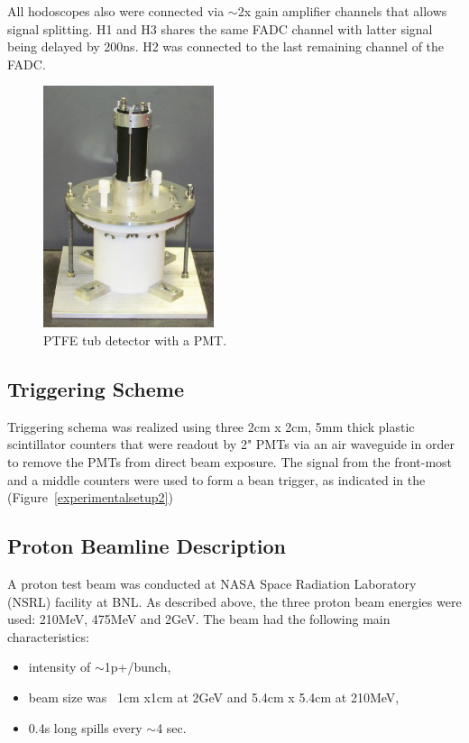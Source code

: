 \documentclass[preprint,12pt]{elsarticle}
\begin{document}
All hodoscopes also were connected via $\sim$2x gain amplifier channels that allows signal splitting. H1 and H3 shares the same FADC channel with latter signal being delayed by 200ns. H2 was connected to the last remaining channel of the FADC.





\begin{figure}[ht]
\centering
\includegraphics[width=50mm]{figure1_tub.jpg}
\caption{PTFE tub detector with a PMT.} \label{whitetubpicture}
\end{figure}

\subsection{Triggering Scheme}
\label{trigs}
Triggering schema was realized using three 2cm x 2cm, 5mm thick plastic scintillator counters that were readout by 2" PMTs via an air waveguide in order to remove the PMTs from direct beam exposure. The signal from the front-most and a middle counters were used to form a bean trigger, as indicated in the (Figure~\ref{experimentalsetup2})




\subsection{Proton Beamline Description}
A proton test beam was conducted at NASA Space Radiation Laboratory (NSRL) facility at BNL. As described above, the three proton beam energies were used:
210MeV, 475MeV and 2GeV. The beam had the following main characteristics:

\begin{itemize}
	\item intensity of $\sim$1p+/bunch,
	\item beam size was ~1cm x1cm at 2GeV and 5.4cm x 5.4cm at 210MeV,
	\item 0.4s long spills every $\sim$4 sec.
\end{itemize}
\end{document}
